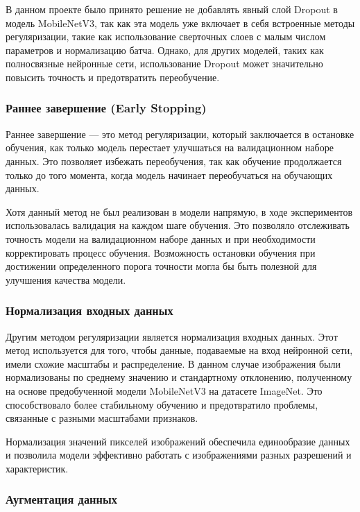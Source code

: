 {    В данном проекте было принято решение не добавлять явный слой Dropout в модель MobileNetV3, так как эта модель уже включает в себя встроенные методы регуляризации, такие как использование сверточных слоев с малым числом параметров и нормализацию батча. Однако, для других моделей, таких как полносвязные нейронные сети, использование Dropout может значительно повысить точность и предотвратить переобучение.

    \subsubsection*{Раннее завершение (Early Stopping)}

    Раннее завершение — это метод регуляризации, который заключается в остановке обучения, как только модель перестает улучшаться на валидационном наборе данных. Это позволяет избежать переобучения, так как обучение продолжается только до того момента, когда модель начинает переобучаться на обучающих данных.

    Хотя данный метод не был реализован в модели напрямую, в ходе экспериментов использовалась валидация на каждом шаге обучения. Это позволяло отслеживать точность модели на валидационном наборе данных и при необходимости корректировать процесс обучения. Возможность остановки обучения при достижении определенного порога точности могла бы быть полезной для улучшения качества модели.

    \subsubsection*{Нормализация входных данных}

    Другим методом регуляризации является нормализация входных данных. Этот метод используется для того, чтобы данные, подаваемые на вход нейронной сети, имели схожие масштабы и распределение. В данном случае изображения были нормализованы по среднему значению и стандартному отклонению, полученному на основе предобученной модели MobileNetV3 на датасете ImageNet. Это способствовало более стабильному обучению и предотвратило проблемы, связанные с разными масштабами признаков.

    Нормализация значений пикселей изображений обеспечила единообразие данных и позволила модели эффективно работать с изображениями разных разрешений и характеристик.

    \subsubsection*{Аугментация данных}

}

